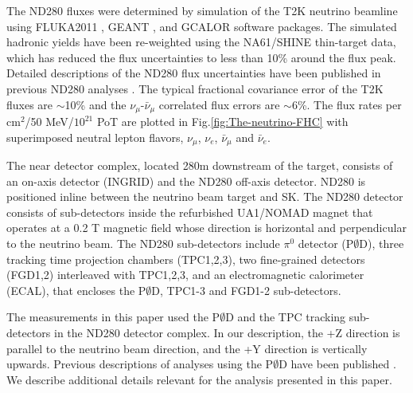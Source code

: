 The ND280 \nuandnubar fluxes were determined by simulation
of the T2K neutrino beamline \citep{t2k-flux} using 
FLUKA2011 \citep{fluka}, 
GEANT \citep{geant},
and GCALOR \citep{gcalor} 
software packages. The simulated hadronic yields have been re-weighted
using the %
NA61/SHINE \citep{shine} thin-target data,
which has reduced the flux uncertainties to less than 10\% around the flux peak.
Detailed
descriptions of the ND280 flux uncertainties have been published in
previous ND280 analyses \citep{tpc-analysis-paper}. 
The typical fractional covariance
error of the T2K \nuandnubar fluxes are $\sim$10\%
and the $\nu_\mu$-$\bar\nu_\mu$ correlated flux errors are $\sim$6\%.
The \nuandnubar flux rates
per cm$^{2}$/50 MeV/$10^{21}$ PoT are plotted in Fig.\ref{fig:The-neutrino-FHC}
with superimposed neutral lepton flavors, $\nu_\mu$,  $\nu_e$, $\bar\nu_\mu$ and $\bar\nu_e$.

The near detector complex, located 280m downstream of the target, consists
of an on-axis
detector (INGRID) and the ND280 off-axis detector. %
ND280 is positioned 
inline between the neutrino beam target and SK.  
The ND280 detector consists of sub-detectors inside
the refurbished UA1/NOMAD magnet that operates at a 0.2 T magnetic
field whose direction is horizontal and perpendicular to the neutrino beam.
The ND280 sub-detectors include $\pi^0$ detector \citep{p0d-1} (P$\emptyset$D),
three tracking time projection chambers \citep{tpc} (TPC1,2,3), two
fine-grained detectors (FGD1,2) interleaved with TPC1,2,3, and an
electromagnetic calorimeter (ECAL), that encloses the P$\emptyset$D, TPC1-3
and FGD1-2 sub-detectors. 

The measurements in this paper used the P$\emptyset$D and the TPC
tracking sub-detectors in the ND280 detector complex. In our description,
the +Z direction is parallel to the neutrino beam direction, and the +Y direction
is vertically upwards. Previous descriptions of analyses using the P$\emptyset$D have been published \citep{pod-nue}.
We describe additional details relevant for the analysis presented in this paper.

